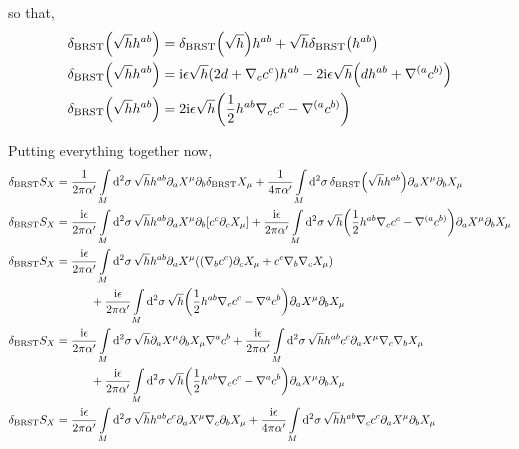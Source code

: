 so that,
\begin{align*}
    \delta_{\textnormal{BRST}}\qty(\sqrt{h}h^{ab})&=\delta_{\textnormal{BRST}}\qty(\sqrt h)h^{ab}+ \sqrt{h}\delta_{\textnormal{BRST}}\qty(h^{ab})\\
    \delta_{\textnormal{BRST}}\qty(\sqrt{h}h^{ab})&=\im\epsilon\sqrt{h}\qty(2d+\nabla_cc^c)h^{ab}-2\im\epsilon \sqrt{h}\qty(d \tensor{h}{^a^b}+\nabla^{(a} c^{b)})\\
    \delta_{\textnormal{BRST}}\qty(\sqrt{h}h^{ab})&=2\im\epsilon\sqrt{h}\qty(\frac12h^{ab}\nabla_cc^c-\nabla^{(a} c^{b)})
\end{align*}

Putting everything together now,
\begin{align*}
    \delta_{\textnormal{BRST}}S_X&=\frac{1}{2\pi\alpha'}\int\limits_{M}\dd[2]{\sigma}\sqrt{h}h^{ab}\partial_aX^\mu\partial_b \delta_{\textnormal{BRST}}X_\mu+\frac{1}{4\pi\alpha'}\int\limits_{M}\dd[2]{\sigma}\delta_{\textnormal{BRST}}\qty(\sqrt{h}h^{ab})\partial_aX^\mu\partial_b X_\mu\\
    \delta_{\textnormal{BRST}}S_X&=\frac{\im\epsilon}{2\pi\alpha'}\int\limits_{M}\dd[2]{\sigma}\sqrt{h}h^{ab}\partial_aX^\mu\partial_b \qty[c^c\partial_cX_\mu]+\frac{\im\epsilon}{2\pi\alpha'}\int\limits_{M}\dd[2]{\sigma}\sqrt{h}\qty(\frac12h^{ab}\nabla_cc^c-\nabla^{(a} c^{b)})\partial_aX^\mu\partial_b X_\mu\\
    \delta_{\textnormal{BRST}}S_X&=\frac{\im\epsilon}{2\pi\alpha'}\int\limits_{M}\dd[2]{\sigma}\sqrt{h}h^{ab}\partial_aX^\mu\qty(\qty(\nabla_bc^c)\partial_cX_\mu+c^c\nabla_b\nabla_cX_\mu)\\
    &\quad\quad\quad+\frac{\im\epsilon}{2\pi\alpha'}\int\limits_{M}\dd[2]{\sigma}\sqrt{h}\qty(\frac12h^{ab}\nabla_cc^c-\nabla^a c^b)\partial_aX^\mu\partial_b X_\mu\\
    \delta_{\textnormal{BRST}}S_X&=\frac{\im\epsilon}{2\pi\alpha'}\int\limits_{M}\dd[2]{\sigma}\sqrt{h}\partial_aX^\mu\partial_bX_\mu\nabla^ac^b+\frac{\im\epsilon}{2\pi\alpha'}\int\limits_{M}\dd[2]{\sigma}\sqrt{h}h^{ab}c^c\partial_aX^\mu \nabla_c\nabla_bX_\mu\\
    &\quad\quad\quad+\frac{\im\epsilon}{2\pi\alpha'}\int\limits_{M}\dd[2]{\sigma}\sqrt{h}\qty(\frac12h^{ab}\nabla_cc^c-\nabla^a c^b)\partial_aX^\mu\partial_b X_\mu\\
    \delta_{\textnormal{BRST}}S_X&=\frac{\im\epsilon}{2\pi\alpha'}\int\limits_{M}\dd[2]{\sigma}\sqrt{h}h^{ab}c^c\partial_aX^\mu \nabla_c\partial_bX_\mu+\frac{\im\epsilon}{4\pi\alpha'}\int\limits_{M}\dd[2]{\sigma}\sqrt{h}h^{ab}\nabla_cc^c\partial_aX^\mu\partial_b X_\mu\\

\end{align*}
